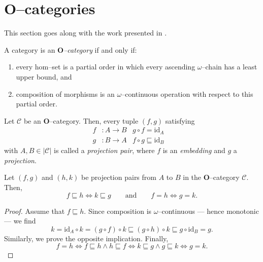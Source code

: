 \section{\(\mathbf{O}\)--categories}

This section goes along with the work presented in \cite{MR677666}.

\begin{dfn}
  A category is an \emph{\(\mathbf{O}\)--category} if and only if:
  \begin{enumerate}
    \item every hom--set is a partial order in which every ascending \(\omega\)--chain has a least upper bound, and
    \item composition of morphisms is an \(\omega\)--continuous operation with respect to this partial order.
  \end{enumerate}
\end{dfn}

\begin{dfn}
  Let \(\mathcal{C}\) be an \(\mathbf{O}\)--category. Then, every tuple \((f,g)\) satisfying
  \begin{align}
    f &\colon A \to B & g \circ f = \mathrm{id}_A \quad  \\
    g &\colon B \to A & f \circ g \sqsubseteq \mathrm{id}_B \quad 
  \end{align}
  with \(A,B \in \lvert\mathcal{C}\rvert\) is called a \emph{projection pair}, where \(f\) is an \emph{embedding} and \(g\) a \emph{projection}.
\end{dfn}

\begin{lem}
  Let \((f,g)\) and \((h,k)\) be projection pairs from \(A\) to \(B\) in the \(\mathbf{O}\)--category \(\mathcal{C}\). Then,
  \begin{equation*}
    f \sqsubseteq h \iff k \sqsubseteq g \qquad \text{and} \qquad
    f = h \iff g = k.
  \end{equation*}
\end{lem}
\begin{proof}
  Assume that \(f \sqsubseteq h\). Since composition is \(\omega\)--continuous --- hence monotonic --- we find
  \begin{equation*}
    k = \mathrm{id}_A \circ k = (g \circ f) \circ k
    \sqsubseteq (g \circ h) \circ k \sqsubseteq g \circ \mathrm{id}_B = g.
  \end{equation*}
  Similarly, we prove the opposite implication. Finally,
  \begin{equation*}
    f = h \iff f \sqsubseteq h \land h \sqsubseteq f
    \iff k \sqsubseteq g \land g \sqsubseteq k \iff g = k.
  \end{equation*}
\end{proof}

